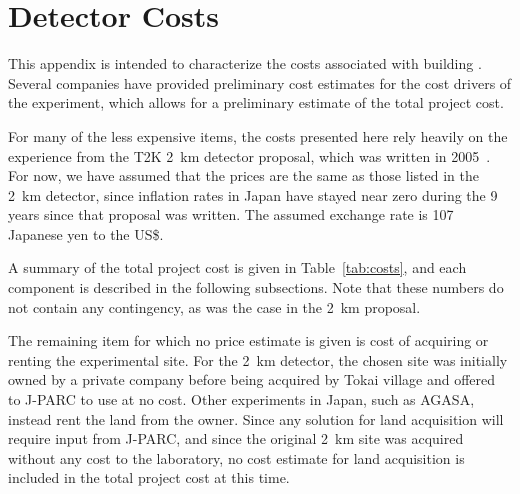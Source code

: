 \section{Detector Costs}\label{sec:detcosts}

This appendix is intended to characterize the costs associated with building \nuprismlite. Several companies have provided preliminary cost estimates for the cost drivers of the experiment, which allows for a preliminary estimate of the total project cost.

For many of the less expensive items, the costs presented here rely heavily on the experience from the T2K 2~km detector proposal, which was written in 2005~\cite{t2k2km}. For now, we have assumed that the prices are the same as those listed in the 2~km detector, since inflation rates in Japan have stayed near zero during the 9 years since that proposal was written. The assumed exchange rate is 107 Japanese yen to the US\$.

A summary of the total project cost is given in Table~\ref{tab:costs}, and each component is described in the following subsections. Note that these numbers do not contain any contingency, as was the case in the 2~km proposal.

The remaining item for which no price estimate is given is cost of acquiring or renting the experimental site. For the 2~km detector, the chosen site was initially owned by a private company before being acquired by Tokai village and offered to J-PARC to use at no cost. Other experiments in Japan, such as AGASA, instead rent the land from the owner. Since any solution for land acquisition will require input from J-PARC, and since the original 2~km site was acquired without any cost to the laboratory, no cost estimate for land acquisition is included in the total project cost at this time.


